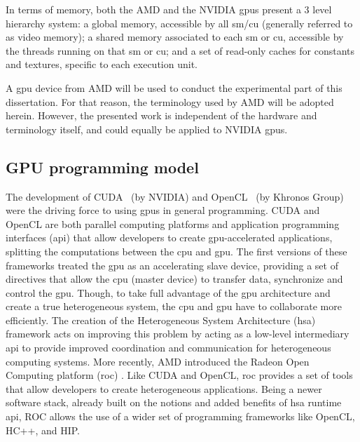 In terms of memory, both the AMD and the NVIDIA \acrshort{gpu}s present a 3 level hierarchy system: a global memory, accessible by all \acrshort{sm}/\acrshort{cu} (generally referred to as video memory); a shared memory associated to each \acrshort{sm} or \acrshort{cu}, accessible by the threads running on that \acrshort{sm} or \acrshort{cu}; and a set of read-only caches for constants and textures, specific to each execution unit.

A \acrshort{gpu} device from AMD will be used to conduct the experimental part of this dissertation. For that reason, the terminology used by AMD will be adopted herein. However, the presented work is independent of the hardware and terminology itself, and could equally be applied to NVIDIA \acrshort{gpu}s.

\subsection{GPU programming model}

The development of CUDA~\cite{nvidia_cuda_2017} (by NVIDIA) and OpenCL~\cite{noauthor_opencl_2013} (by Khronos Group) were the driving force to using \acrshort{gpu}s in general programming. CUDA and OpenCL are both parallel computing platforms and application programming interfaces (\acrshort{api}) that allow developers to create \acrshort{gpu}-accelerated applications, splitting the computations between the \acrshort{cpu} and \acrshort{gpu}. The first versions of these frameworks treated the \acrshort{gpu} as an accelerating slave device, providing a set of directives that allow the \acrshort{cpu} (master device) to transfer data, synchronize and control the \acrshort{gpu}.  Though, to take full advantage of the \acrshort{gpu} architecture and create a true heterogeneous system, the \acrshort{cpu} and \acrshort{gpu} have to collaborate more efficiently. The creation of the Heterogeneous System Architecture (\acrshort{hsa}) \cite{hwu_heterogeneous_2015} framework acts on improving this problem by acting as a low-level intermediary \acrshort{api} to provide improved coordination and communication for heterogeneous computing systems.  More recently, AMD introduced the Radeon Open Computing platform (\acrshort{roc}) \cite{noauthor_radeonopencompute/rocm_2019}. Like CUDA and OpenCL, \acrshort{roc} provides a set of tools that allow developers to create heterogeneous applications. Being a newer software stack, already built on the notions and added benefits of \acrshort{hsa} runtime \acrshort{api}, ROC allows the use of a wider set of programming frameworks like OpenCL, HC++, and HIP.

